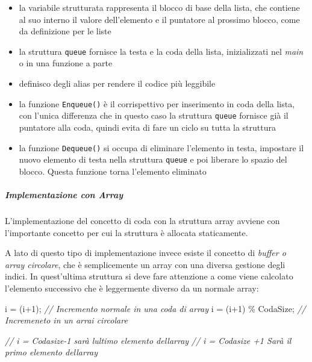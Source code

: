 \documentclass[
]{article}
\newenvironment{Shaded}{}{}
\newcommand{\CommentTok}[1]{\textcolor[rgb]{0.38,0.63,0.69}{\textit{#1}}}
\newcommand{\DecValTok}[1]{\textcolor[rgb]{0.25,0.63,0.44}{#1}}
\newcommand{\NormalTok}[1]{#1}
\begin{document}
\begin{itemize}
\item
  la variabile strutturata rappresenta il blocco di base della lista,
  che contiene al suo interno il valore dell'elemento e il puntatore al
  prossimo blocco, come da definizione per le liste
\item
  la struttura \texttt{queue} fornisce la testa e la coda della lista,
  inizializzati nel \emph{main} o in una funzione a parte
\item
  definisco degli alias per rendere il codice più leggibile
\item
  la funzione \texttt{Enqueue()} è il corrispettivo per inserimento in
  coda della lista, con l'unica differenza che in questo caso la
  struttura \texttt{queue} fornisce già il puntatore alla coda, quindi
  evita di fare un ciclo su tutta la struttura
\item
  la funzione \texttt{Dequeue()} si occupa di eliminare l'elemento in
  testa, impostare il nuovo elemento di testa nella struttura
  \texttt{queue} e poi liberare lo spazio del blocco. Questa funzione
  torna l'elemento eliminato
\end{itemize}

\hypertarget{header-n1448}{%
\subparagraph{\texorpdfstring{Implementazione con
\emph{Array}}{Implementazione con Array}}\label{header-n1448}}

L'implementazione del concetto di coda con la struttura array avviene
con l'importante concetto per cui la struttura è allocata staticamente.

A lato di questo tipo di implementazione invece esiste il concetto di
\emph{buffer o array circolare}, che è semplicemente un array con una
diversa gestione degli indici. In quest'ultima struttura si deve fare
attenzione a come viene calcolato l'elemento successivo che è
leggermente diverso da un normale array:

\begin{Shaded}
\begin{Highlighting}[]
\NormalTok{i = (i+}\DecValTok{1}\NormalTok{); 			  }\CommentTok{// Incremento normale in una coda di array}
\NormalTok{i = (i+}\DecValTok{1}\NormalTok{) \% CodaSize; }\CommentTok{// Incremeneto in un arrai circolare}

\CommentTok{// i = Codasize{-}1 sarà l\textquotesingle{}ultimo elemento dell\textquotesingle{}array}
\CommentTok{// i = Codasize +1 Sarà il primo elemento dell\textquotesingle{}array}
\end{Highlighting}
\end{Shaded}
\end{document}
